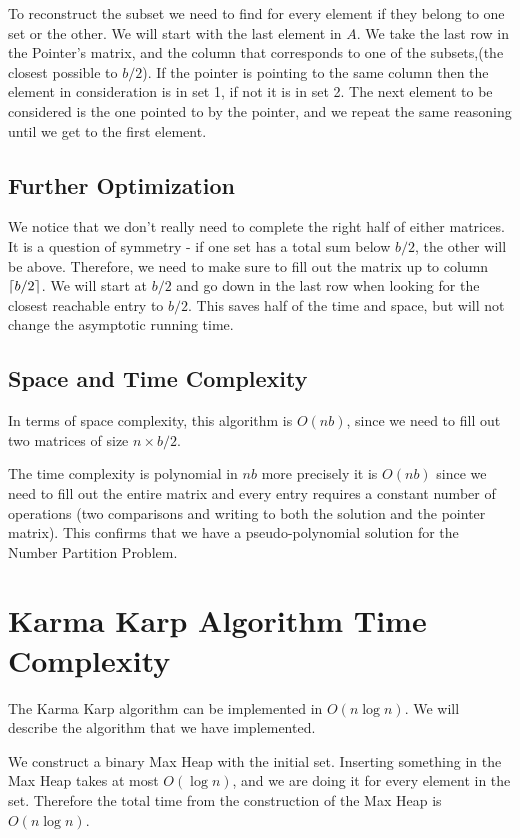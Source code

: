 \documentclass[11pt]{article}
\DeclarePairedDelimiter\ceil{\lceil}{\rceil}
\begin{document}
To reconstruct the subset we need to find for every element if they belong to one set or the other. We will start with the last element in $A$. We take the last row in the Pointer's matrix, and the column that corresponds to one of the subsets,(the closest possible to $b/2$). If the pointer is pointing to the same column then the element in consideration is in set 1, if not it is in set 2. The next element to be considered is the one pointed to by the pointer, and we repeat the same reasoning until we get to the first element.

\subsection{Further Optimization}
We notice that we don't really need to complete the right half of either matrices. It is a question of symmetry - if one set has a total sum below $b/2$, the other will be above. Therefore, we need to make sure to fill out the matrix up to column $\ceil*{b/2}$. We will start at $b/2$ and go down in the last row when looking for the closest reachable entry to $b/2$.
This saves half of the time and space, but will not change the asymptotic running time. 

\subsection{Space and Time Complexity}

In terms of space complexity, this algorithm is $O(nb)$, since we need to fill out two matrices of size $n\times b/2$.

The time complexity is polynomial in $nb$ more precisely it is $O(nb)$ since we need to fill out the entire matrix and every entry requires a constant number of operations (two comparisons and writing to both the solution and the pointer matrix). This confirms that we have a pseudo-polynomial solution for the Number Partition Problem. 




\section{Karma Karp Algorithm Time Complexity}
The Karma Karp algorithm can be implemented in $O(n\log n)$. 
We will describe the algorithm that we have implemented.

We construct a binary Max Heap with the initial set. Inserting something in the Max Heap takes at most $O(\log n)$, and we are doing it for every element in the set. Therefore the total time from the construction of the Max Heap is $O(n \log n)$.
\end{document}
